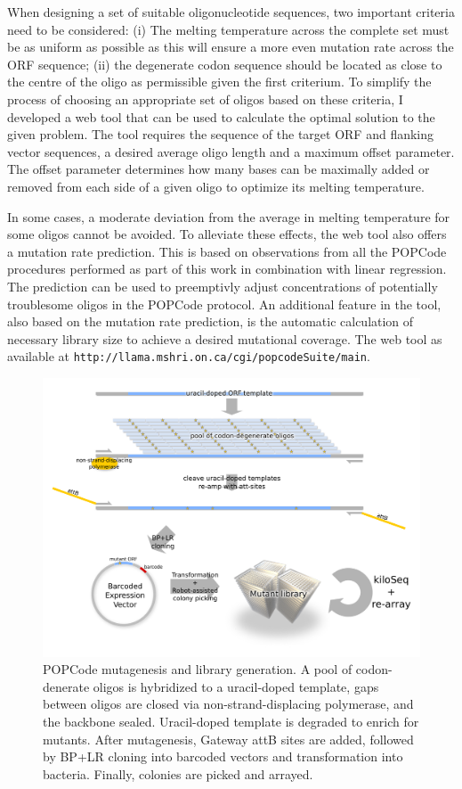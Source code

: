 When designing a set of suitable oligonucleotide sequences, two important criteria need to be considered: 
(i) The melting temperature across the complete set must be as uniform as possible as this will ensure a more even mutation rate across the ORF sequence; (ii) the degenerate codon sequence should be located as close to the centre of the oligo as permissible given the first criterium. To simplify the process of choosing an appropriate set of oligos based on these criteria, I developed a web tool that can be used to calculate the optimal solution to the given problem. The tool requires the sequence of the target ORF and flanking vector sequences, a desired average oligo length and a maximum offset parameter. The offset parameter determines how many bases can be maximally added or removed from each side of a given oligo to optimize its melting temperature. 

In some cases, a moderate deviation from the average in melting temperature for some oligos cannot be avoided. To alleviate these effects, the web tool also offers a mutation rate prediction. This is based on observations from all the POPCode procedures performed as part of this work in combination with linear regression. The prediction can be used to preemptivly adjust concentrations of potentially troublesome oligos in the POPCode protocol. An additional feature in the tool, also based on the mutation rate prediction, is the automatic calculation of necessary library size to achieve a desired mutational coverage. The web tool as available at \verb|http://llama.mshri.on.ca/cgi/popcodeSuite/main|.


\begin{figure}[h!]
	\centering
	\includegraphics[width=\textwidth]{img/popcode_schema.pdf}%
	\caption{POPCode mutagenesis and library generation. A pool of codon-denerate oligos is hybridized to a uracil-doped template, gaps between oligos are closed via non-strand-displacing polymerase, and the backbone sealed. Uracil-doped template is degraded to enrich for mutants. After mutagenesis, Gateway attB sites are added, followed by BP+LR cloning into barcoded vectors and transformation into bacteria. Finally, colonies are picked and arrayed.}
	\label{fig:popcode_schema}
\end{figure}

